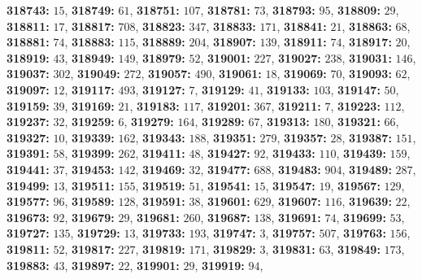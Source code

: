 \textsf{\bfseries 318743:} $15$, \textsf{\bfseries 318749:} $61$, \textsf{\bfseries 318751:} $107$, \textsf{\bfseries 318781:} $73$, \textsf{\bfseries 318793:} $95$, \textsf{\bfseries 318809:} $29$, \textsf{\bfseries 318811:} $17$, \textsf{\bfseries 318817:} $708$, \textsf{\bfseries 318823:} $347$, \textsf{\bfseries 318833:} $171$, \textsf{\bfseries 318841:} $21$, \textsf{\bfseries 318863:} $68$, \textsf{\bfseries 318881:} $74$, \textsf{\bfseries 318883:} $115$, \textsf{\bfseries 318889:} $204$, \textsf{\bfseries 318907:} $139$, \textsf{\bfseries 318911:} $74$, \textsf{\bfseries 318917:} $20$, \textsf{\bfseries 318919:} $43$, \textsf{\bfseries 318949:} $149$, \textsf{\bfseries 318979:} $52$, \textsf{\bfseries 319001:} $227$, \textsf{\bfseries 319027:} $238$, \textsf{\bfseries 319031:} $146$, \textsf{\bfseries 319037:} $302$, \textsf{\bfseries 319049:} $272$, \textsf{\bfseries 319057:} $490$, \textsf{\bfseries 319061:} $18$, \textsf{\bfseries 319069:} $70$, \textsf{\bfseries 319093:} $62$, \textsf{\bfseries 319097:} $12$, \textsf{\bfseries 319117:} $493$, \textsf{\bfseries 319127:} $7$, \textsf{\bfseries 319129:} $41$, \textsf{\bfseries 319133:} $103$, \textsf{\bfseries 319147:} $50$, \textsf{\bfseries 319159:} $39$, \textsf{\bfseries 319169:} $21$, \textsf{\bfseries 319183:} $117$, \textsf{\bfseries 319201:} $367$, \textsf{\bfseries 319211:} $7$, \textsf{\bfseries 319223:} $112$, \textsf{\bfseries 319237:} $32$, \textsf{\bfseries 319259:} $6$, \textsf{\bfseries 319279:} $164$, \textsf{\bfseries 319289:} $67$, \textsf{\bfseries 319313:} $180$, \textsf{\bfseries 319321:} $66$, \textsf{\bfseries 319327:} $10$, \textsf{\bfseries 319339:} $162$, \textsf{\bfseries 319343:} $188$, \textsf{\bfseries 319351:} $279$, \textsf{\bfseries 319357:} $28$, \textsf{\bfseries 319387:} $151$, \textsf{\bfseries 319391:} $58$, \textsf{\bfseries 319399:} $262$, \textsf{\bfseries 319411:} $48$, \textsf{\bfseries 319427:} $92$, \textsf{\bfseries 319433:} $110$, \textsf{\bfseries 319439:} $159$, \textsf{\bfseries 319441:} $37$, \textsf{\bfseries 319453:} $142$, \textsf{\bfseries 319469:} $32$, \textsf{\bfseries 319477:} $688$, \textsf{\bfseries 319483:} $904$, \textsf{\bfseries 319489:} $287$, \textsf{\bfseries 319499:} $13$, \textsf{\bfseries 319511:} $155$, \textsf{\bfseries 319519:} $51$, \textsf{\bfseries 319541:} $15$, \textsf{\bfseries 319547:} $19$, \textsf{\bfseries 319567:} $129$, \textsf{\bfseries 319577:} $96$, \textsf{\bfseries 319589:} $128$, \textsf{\bfseries 319591:} $38$, \textsf{\bfseries 319601:} $629$, \textsf{\bfseries 319607:} $116$, \textsf{\bfseries 319639:} $22$, \textsf{\bfseries 319673:} $92$, \textsf{\bfseries 319679:} $29$, \textsf{\bfseries 319681:} $260$, \textsf{\bfseries 319687:} $138$, \textsf{\bfseries 319691:} $74$, \textsf{\bfseries 319699:} $53$, \textsf{\bfseries 319727:} $135$, \textsf{\bfseries 319729:} $13$, \textsf{\bfseries 319733:} $193$, \textsf{\bfseries 319747:} $3$, \textsf{\bfseries 319757:} $507$, \textsf{\bfseries 319763:} $156$, \textsf{\bfseries 319811:} $52$, \textsf{\bfseries 319817:} $227$, \textsf{\bfseries 319819:} $171$, \textsf{\bfseries 319829:} $3$, \textsf{\bfseries 319831:} $63$, \textsf{\bfseries 319849:} $173$, \textsf{\bfseries 319883:} $43$, \textsf{\bfseries 319897:} $22$, \textsf{\bfseries 319901:} $29$, \textsf{\bfseries 319919:} $94$, 
